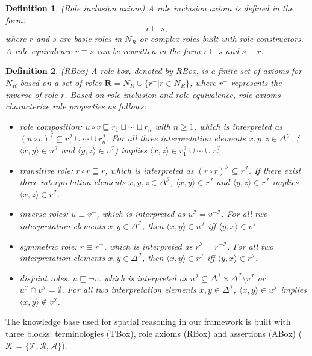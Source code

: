 \documentclass{article}
\newtheorem{mydef}{Definition}
\begin{document}
\begin{mydef}(Role inclusion axiom) 
 A role inclusion axiom is defined in the form:
 $$r\sqsubseteq s,$$
 where $r$ and $s$ are basic roles in $N_R$ or complex roles built with role constructors. A role equivalence $r\equiv s$ can be rewritten in the form $r\sqsubseteq s$ and $s\sqsubseteq r$.
\end{mydef}
\begin{mydef}(RBox)
A role box, denoted by RBox, is a finite set
of axioms for $N_R$  based on a set of roles $\mathbf{R}=N_R\cup\{r^-| r\in N_R\}$, where $r^-$  represents the inverse of role $r$.
Based on role inclusion and role equivalence, role axioms characterize role properties as follows:
\begin{itemize}
 \item role composition: $u\circ v \sqsubseteq r_1\sqcup \cdots\sqcup r_n$ with $n\geqslant 1$, which is interpreted as 
 $(u\circ v)^\mathcal{I} \subseteq r_1^\mathcal{I} \cup \cdots \cup r_n^\mathcal{I}$. For all three interpretation elements $x,y,z\in \Delta^\mathcal{I}$, 
 ($\langle x,y \rangle \in u^\mathcal{I}$ and $\langle y,z \rangle \in v^\mathcal{I}$) implies  $\langle x,z \rangle \in r_1^\mathcal{I} \cup \cdots \cup r_n^\mathcal{I}$. 
 \item transitive role: $r\circ r \sqsubseteq r$, which is interpreted as $(r\circ r)^\mathcal{I} \subseteq r^\mathcal{I}$. If there exist three interpretation elements
 $x,y,z\in \Delta^\mathcal{I}$, $\langle x,y \rangle \in r^\mathcal{I}$ and $\langle y,z \rangle \in r^\mathcal{I}$ implies  $\langle x,z \rangle \in r^\mathcal{I}$.
 \item inverse roles: $u \equiv v^-$, which is interpreted as $u^\mathcal{I} = v^{-\mathcal{I}}$. For all two interpretation elements  $x,y\in \Delta^\mathcal{I}$,
 then $\langle x,y \rangle \in u^\mathcal{I}$ iff $\langle y,x \rangle \in v^\mathcal{I}$.
 \item symmetric role: $r \equiv r^-$, which is interpreted as $r^\mathcal{I} = r^{-\mathcal{I}}$. For all two interpretation elements  $x,y\in \Delta^\mathcal{I}$,
 then $\langle x,y \rangle \in r^\mathcal{I}$ iff $\langle y,x \rangle \in r^\mathcal{I}$.
 \item disjoint roles: $u\sqsubseteq \neg v$. which is interpreted as $u^\mathcal{I} \subseteq \Delta^\mathcal{I} \times \Delta^\mathcal{I} \setminus v^\mathcal{I}$ or $u^\mathcal{I}\cap v^\mathcal{I}=\emptyset$. 
 For all two interpretation elements  $x,y\in \Delta^\mathcal{I}$, 
$\langle x,y \rangle \in u^\mathcal{I}$ implies $\langle x,y \rangle \notin v^\mathcal{I}$.
\end{itemize}
\end{mydef}
The knowledge base used for spatial reasoning in our framework is built with three blocks: terminologies (TBox), role axioms (RBox) and assertions (ABox)
($\mathcal{K}=\{\mathcal{T},\mathcal{R},\mathcal{A}\}$).
\end{document}
